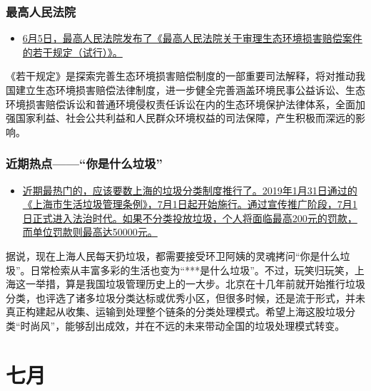 \documentclass[]{book}
\providecommand{\tightlist}{%
  \setlength{\itemsep}{0pt}\setlength{\parskip}{0pt}}
\begin{document}
\hypertarget{ux6700ux9ad8ux4ebaux6c11ux6cd5ux9662}{%
\subsubsection*{最高人民法院}\label{ux6700ux9ad8ux4ebaux6c11ux6cd5ux9662}}

\begin{itemize}
\tightlist
\item
  \href{http://www.hncourt.gov.cn/public/detail.php?id=177804}{6月5日，最高人民法院发布了《最高人民法院关于审理生态环境损害赔偿案件的若干规定（试行）》。}
\end{itemize}

《若干规定》是探索完善生态环境损害赔偿制度的一部重要司法解释，将对推动我国建立生态环境损害赔偿法律制度，进一步健全完善涵盖环境民事公益诉讼、生态环境损害赔偿诉讼和普通环境侵权责任诉讼在内的生态环境保护法律体系，全面加强国家利益、社会公共利益和人民群众环境权益的司法保障，产生积极而深远的影响。

\hypertarget{ux8fd1ux671fux70edux70b9ux4f60ux662fux4ec0ux4e48ux5783ux573e}{%
\subsubsection*{近期热点------``你是什么垃圾''}\label{ux8fd1ux671fux70edux70b9ux4f60ux662fux4ec0ux4e48ux5783ux573e}}

\begin{itemize}
\tightlist
\item
  \href{http://www.hncourt.gov.cn/public/detail.php?id=177804}{近期最热门的，应该要数上海的垃圾分类制度推行了。2019年1月31日通过的《上海市生活垃圾管理条例》，7月1日起开始施行。通过宣传推广阶段，7月1日正式进入法治时代。如果不分类投放垃圾，个人将面临最高200元的罚款，而单位罚款则最高达50000元。}
\end{itemize}

据说，现在上海人民每天扔垃圾，都需要接受环卫阿姨的灵魂拷问``你是什么垃圾''。日常检索从丰富多彩的生活也变为``***是什么垃圾''。不过，玩笑归玩笑，上海这一举措，算是我国垃圾管理历史上的一大步。北京在十几年前就开始推行垃圾分类，也评选了诸多垃圾分类达标或优秀小区，但很多时候，还是流于形式，并未真正构建起从收集、运输到处理整个链条的分类处理模式。希望上海这股垃圾分类``时尚风''，能够刮出成效，并在不远的未来带动全国的垃圾处理模式转变。

\hypertarget{ux4e03ux6708-1}{%
\section*{七月}\label{ux4e03ux6708-1}}
\end{document}

